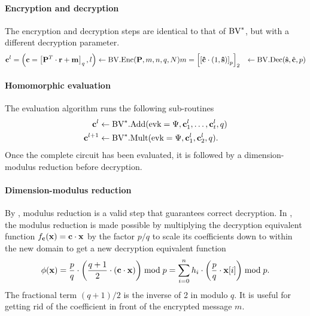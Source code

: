 \documentclass[../main.tex]{subfiles}
\begin{document}
\paragraph{Encryption and decryption}
The encryption and decryption steps are identical to that of $\text{BV}^*$, but with a different decryption parameter.  
\begin{align*}
    \vc{c}^l=\left(\vc{c}=\sqbracket{\vc{P}^T \cdot \vc{r}+ \vc{m}}_q, l \right) &\leftarrow \bv.\enc(\vc{P},m,n,q,N) %
    m=\sqbracket{\sqbracket{\vc{\hat{c}} \cdot (1, \vc{\hat{s}})}_p}_2
    &\leftarrow \bv.\dec(\hat{\vc{s}}, \hat{\vc{c}},p) %
\end{align*}


\paragraph{Homomorphic evaluation}

The evaluation algorithm runs the following sub-routines
\begin{align*}
    \mathbf{c}^l &\leftarrow \text{BV}^*.\text{Add}(\text{evk}=\Psi,\mathbf{c}_1^l,\dots,\mathbf{c}_t^l,q)\\
    \mathbf{c}^{l+1} &\leftarrow \text{BV}^*.\text{Mult}(\text{evk}=\Psi,\mathbf{c}_1^l,\mathbf{c}_2^l,q).
\end{align*} 
Once the complete circuit has been evaluated, it is followed by a dimension-modulus reduction before decryption. 

\paragraph{Dimension-modulus reduction}
By , modulus reduction is a valid step that guarantees correct decryption. In \cite{brakerski2014efficient}, the modulus reduction is made possible by multiplying the decryption equivalent function $f_{\mathbf{c}}(\mathbf{x})=\mathbf{c} \cdot \mathbf{x}$ by the factor $p/q$ to scale its coefficients down to within the new domain to get a new decryption equivalent function
\begin{align*}
    \phi(\mathbf{x}) = \frac{p}{q} \cdot \left({\frac{q+1}{2} \cdot \left({\mathbf{c} \cdot \mathbf{x}}\right)}\right) \bmod p
    = \sum_{i=0}^n h_i \cdot \left({\frac{p}{q} \cdot \mathbf{x}[i]}\right) \bmod p.
\end{align*}
The fractional term $(q+1)/2$ is the inverse of 2 in modulo $q$. It is useful for getting rid of the coefficient in front of the encrypted message $m$. 
\end{document}
